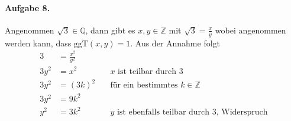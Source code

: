 \documentclass{article}
\begin{document}

\paragraph{Aufgabe 8.} Angenommen $\sqrt{3} \in \mathbb{Q}$, dann gibt es $x, y \in \mathbb{Z}$ mit $\sqrt{3} = \frac{x}{y}$ wobei angenommen werden kann, dass $\text{ggT}(x, y) = 1$. Aus der Annahme folgt
\begin{align*}
    3 &= \frac{x^2}{y^2} \\
    3y^2 &= x^2 \quad &\text{$x$ ist teilbar durch 3} \\
    3y^2 &= (3k)^2 \quad &\text{f\"ur ein bestimmtes $k \in \mathbb{Z}$} \\
    3y^2 &= 9k^2 \\
    y^2 &= 3k^2 \quad &\text{$y$ ist ebenfalls teilbar durch 3, Widerspruch} \\
\end{align*}
\end{document}
